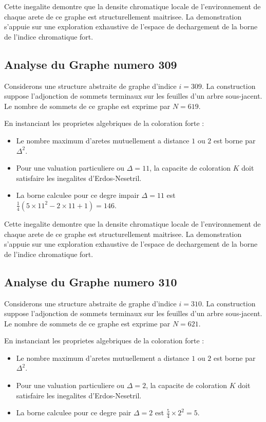 \documentclass[11pt,a4paper]{article}
\begin{document}
Cette inegalite demontre que la densite chromatique locale de l'environnement de chaque arete de ce graphe est structurellement maitrisee. La demonstration s'appuie sur une exploration exhaustive de l'espace de dechargement de la borne de l'indice chromatique fort.

\subsection{Analyse du Graphe numero 309}
Considerons une structure abstraite de graphe d'indice $i = 309$. La construction suppose l'adjonction de sommets terminaux sur les feuilles d'un arbre sous-jacent. Le nombre de sommets de ce graphe est exprime par $N = 619$.

En instanciant les proprietes algebriques de la coloration forte :
\begin{itemize}
\item Le nombre maximum d'aretes mutuellement a distance $1$ ou $2$ est borne par $\Delta^2$.
\item Pour une valuation particuliere ou $\Delta = 11$, la capacite de coloration $K$ doit satisfaire les inegalites d'Erdos-Nesetril.
\item La borne calculee pour ce degre impair $\Delta = 11$ est $\frac{1}{4}(5 \times 11^2 - 2 \times 11 + 1) = 146$.
\end{itemize}

Cette inegalite demontre que la densite chromatique locale de l'environnement de chaque arete de ce graphe est structurellement maitrisee. La demonstration s'appuie sur une exploration exhaustive de l'espace de dechargement de la borne de l'indice chromatique fort.

\subsection{Analyse du Graphe numero 310}
Considerons une structure abstraite de graphe d'indice $i = 310$. La construction suppose l'adjonction de sommets terminaux sur les feuilles d'un arbre sous-jacent. Le nombre de sommets de ce graphe est exprime par $N = 621$.

En instanciant les proprietes algebriques de la coloration forte :
\begin{itemize}
\item Le nombre maximum d'aretes mutuellement a distance $1$ ou $2$ est borne par $\Delta^2$.
\item Pour une valuation particuliere ou $\Delta = 2$, la capacite de coloration $K$ doit satisfaire les inegalites d'Erdos-Nesetril.
\item La borne calculee pour ce degre pair $\Delta = 2$ est $\frac{5}{4} \times 2^2 = 5$.
\end{itemize}
\end{document}
